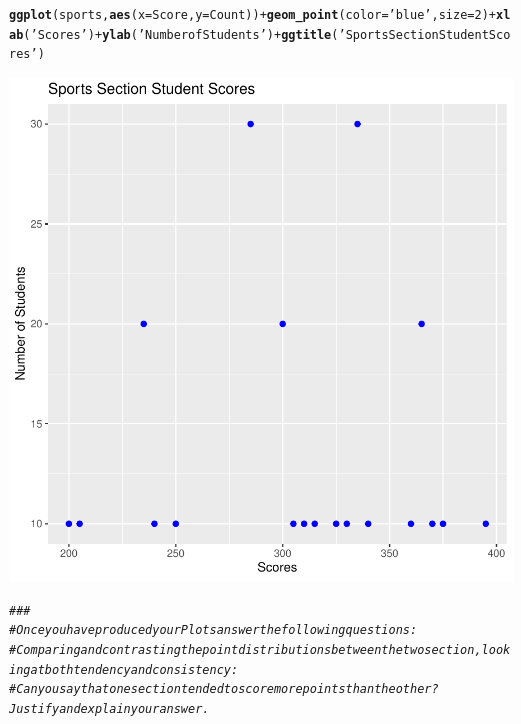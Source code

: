 \documentclass{article}\usepackage[]{graphicx}\usepackage[]{xcolor}
\makeatletter
\newcommand{\hlnum}[1]{\textcolor[rgb]{0.686,0.059,0.569}{#1}}%
\newcommand{\hlstr}[1]{\textcolor[rgb]{0.192,0.494,0.8}{#1}}%
\newcommand{\hlcom}[1]{\textcolor[rgb]{0.678,0.584,0.686}{\textit{#1}}}%
\newcommand{\hlopt}[1]{\textcolor[rgb]{0,0,0}{#1}}%
\newcommand{\hlstd}[1]{\textcolor[rgb]{0.345,0.345,0.345}{#1}}%
\newcommand{\hlkwc}[1]{\textcolor[rgb]{0.333,0.667,0.333}{#1}}%
\newcommand{\hlkwd}[1]{\textcolor[rgb]{0.737,0.353,0.396}{\textbf{#1}}}%
\newenvironment{kframe}{%
 \def\at@end@of@kframe{}%
 \ifinner\ifhmode%
  \def\at@end@of@kframe{\end{minipage}}%
  \begin{minipage}{\columnwidth}%
 \fi\fi%
 \def\FrameCommand##1{\hskip\@totalleftmargin \hskip-\fboxsep
 \colorbox{shadecolor}{##1}\hskip-\fboxsep
     \hskip-\linewidth \hskip-\@totalleftmargin \hskip\columnwidth}%
 \MakeFramed {\advance\hsize-\width
   \@totalleftmargin\z@ \linewidth\hsize
   \@setminipage}}%
 {\par\unskip\endMakeFramed%
 \at@end@of@kframe}
\newenvironment{knitrout}{}{} %
\makeatother
\begin{document}
\begin{knitrout}
{}


\begin{kframe}\begin{alltt}
\hlkwd{ggplot}\hlstd{(sports,} \hlkwd{aes}\hlstd{(}\hlkwc{x}\hlstd{=Score,} \hlkwc{y}\hlstd{=Count))} \hlopt{+} \hlkwd{geom_point}\hlstd{(}\hlkwc{color} \hlstd{=} \hlstr{'blue'}\hlstd{,} \hlkwc{size} \hlstd{=} \hlnum{2}\hlstd{)} \hlopt{+} \hlkwd{xlab}\hlstd{(}\hlstr{'Scores'}\hlstd{)} \hlopt{+} \hlkwd{ylab}\hlstd{(}\hlstr{'Number of Students'}\hlstd{)} \hlopt{+} \hlkwd{ggtitle}\hlstd{(}\hlstr{'Sports Section Student Scores'}\hlstd{)}
\end{alltt}
\end{kframe}

{\centering \includegraphics[width=.6\linewidth]{figure/assignment-4-1-SyversonLuke-Rnwauto-report-2} 

}


\begin{kframe}\begin{alltt}
\hlcom{###}
\hlcom{# Once you have produced your Plots answer the following questions:}
\hlcom{# Comparing and contrasting the point distributions between the two section, looking at both tendency and consistency:}
\hlcom{# Can you say that one section tended to score more points than the other? Justify and explain your answer.}


\end{alltt}
\end{kframe}
\end{knitrout}
\end{document}
